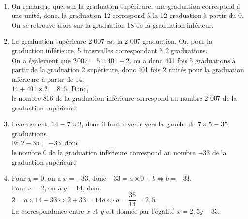 \ \\ [-5mm]
   \begin{enumerate}
      \item On remarque que, sur la graduation supérieure, une graduation correspond à une unité, donc, la graduation 12 correspond à la 12 graduation à partir du 0. On se retrouve alors sur la {\blue graduation 18} de la graduation inférieur.
      \item La graduation supérieure 2 007 est la 2 007  graduation. Or, pour la graduation inférieure, 5 intervalles correspondant à 2 graduations. \\
         On a également que $2\,007=5\times401+2$, on a donc 401 fois 5 graduations à partir de la graduation 2 supérieure, donc 401 fois 2 unités pour la graduation inférieure à partir de 14. \\
         $14+401\times2 =816$. Donc, \\
         {\blue le nombre 816 de la graduation inférieure correspond au nombre 2 007 de la graduation supérieure.}
      \item Inversement, $14 =7\times2$, donc il faut revenir vers la gauche de $7\times5 =35$ graduations. \\
         Et $2-35 =-33$, donc \\
         {\blue le nombre 0 de la graduation inférieure correspond au nombre $-33$ de la graduation supérieure.}
      \item Pour $y=0$, on a $x =-33$, donc $-33 =a\times0+b \iff b =-33$. \\
         Pour $x=2$, on a $y =14$, donc $2 =a\times14-33 \iff 2+33 =14a \iff a =\dfrac{35}{14} =2,5$. \\ [1mm]
         {\blue La correspondance entre $x$ et $y$ est donnée par l'égalité $x =2,5y-33$.}
   \end{enumerate}
